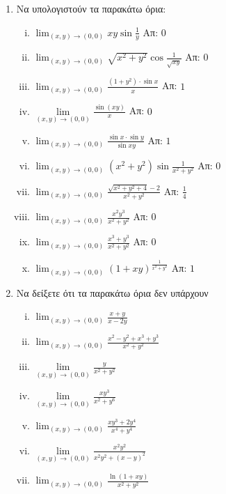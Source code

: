 



\everymath{\displaystyle}



\begin{center}
\end{center}


\vspace{\baselineskip}

\begin{enumerate}
  \item Να υπολογιστούν τα παρακάτω όρια:
  \begin{enumerate}[i)]
	  \item $ \lim_{(x,y)\to (0,0)} xy\sin{\frac{ 1 }{ y }} $ \hfill Απ: $ 0 $
  \item $ \lim_{(x,y)\to (0,0)} \sqrt{ x^{2} + y^{2} } \cos{\frac{ 1 }{ \sqrt{ xy } }} $ \hfill Απ: $ 0 $
      \item $ \lim_{(x,y)\to (0,0)} \frac{ (1+y^{2})\cdot \sin{x} }{ x } $ \hfill Απ: $ 1 $
    \item $\lim\limits_{(x,y)\to (0,0)}\frac{\sin(xy)}{x}$ \hfill Απ: $0$
	\item $ \lim_{(x,y)\to (0,0)} \frac{ \sin{x} \cdot \sin{y} }{ \sin{xy} } $ \hfill Απ: $ 1 $
	  \item $ \lim_{(x,y)\to (0,0)} (x^{2} + y^{2}) \sin{\frac{ 1 }{ x^{2} + y^{2} }} $ \hfill Απ: $ 0 $ 
	\item $ \lim_{(x,y)\to (0,0)} \frac{ \sqrt{ x^{2}+y^{2}+4 } - 2 }{ x^{2}+y^{2} } $ \hfill Απ: $
		\frac{ 1 }{ 4 } $
\item $ \lim_{(x,y)\to (0,0)} \frac{ x^{2}y^{3} }{x^{2}+y^{2}}    $ \hfill Απ: $0 $ 
\item $ \lim_{(x,y)\to (0,0)} \frac{ x^{3}+y^{3} }{ x^{2}+y^{2} } $ \hfill Απ: $ 0 $
\item $ \lim_{(x,y)\to (0,0)} (1+xy)^{\frac{ 1 }{ x^{2}+y^{2} }} $ \hfill Απ: $ 1 $
		  \end{enumerate}
  
  \item Να δείξετε ότι τα παρακάτω όρια δεν υπάρχουν

	  \begin{enumerate}[i)]
		  \item $ \lim_{(x,y)\to (0,0)} \frac{ x + y }{ x - 2y } $ 
		  \item $ \lim_{(x,y)\to (0,0)} \frac{ x^{2}-y^{2}+x^{3}+y^{3} }{ x^{2}+y^{2} } $ 
          \item $ \lim\limits_{(x,y)\to (0, 0)} \frac{y}{x^{2}+y^{2}} $  
          \item $ \lim\limits_{(x,y)\to (0, 0)} \frac{xy^{3}}{x^{2}+y^{6}} $
		  \item $ \lim_{(x,y)\to (0,0)} \frac{ xy^{3} + 2y^{4} }{ x^{4}+y^{4}}  $
		  \item $\lim\limits_{(x,y)\to (0,0)}\frac{x^{2}y^{2}}{x^{2}y^{2}+(x-y)^{2}}$ 
		  \item $ \lim_{(x,y)\to (0,0)} \frac{ \ln{( 1+xy )} }{ x^{2}+y^{2} }  $
	  \end{enumerate}


\end{enumerate}
